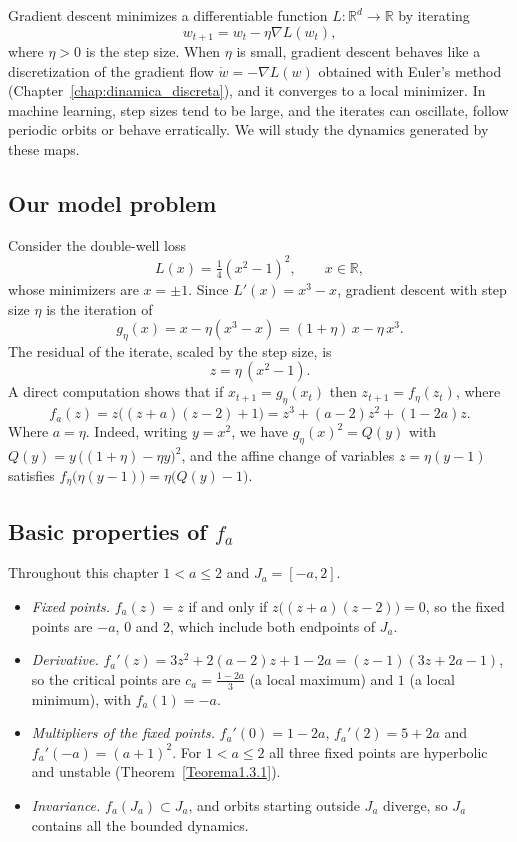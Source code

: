 \documentclass[12pt,a4paper]{report}
\theoremstyle{definition}
\begin{document}
Gradient descent minimizes a differentiable function $L:\mathbb{R}^d\to\mathbb{R}$ by iterating
\[
w_{t+1} = w_t - \eta \nabla L(w_t),
\]
where $\eta>0$ is the step size. When $\eta$ is small, gradient descent behaves like a discretization of the gradient flow $\dot w = -\nabla L(w)$ obtained with Euler's method (Chapter~\ref{chap:dinamica_discreta}), and it converges to a local minimizer. In machine learning, step sizes tend to be large, and the iterates can oscillate, follow periodic orbits or behave erratically. We will study the dynamics generated by these maps.

\subsection*{Our model problem}

Consider the double-well loss
\[
L(x) = \tfrac14 (x^2-1)^2, \qquad x\in\mathbb{R},
\]
whose minimizers are $x=\pm 1$. Since $L'(x) = x^3 - x$, gradient descent with step size $\eta$ is the iteration of
\[
g_\eta(x) = x - \eta (x^3-x) = (1+\eta)\,x - \eta\, x^3 .
\]
The residual of the iterate, scaled by the step size, is
\[
z = \eta\,(x^2-1).
\]
A direct computation shows that if $x_{t+1} = g_\eta(x_t)$ then $z_{t+1} = f_\eta(z_t)$, where
\[
f_a(z) = z\big((z+a)(z-2)+1\big) = z^3 + (a-2)z^2 + (1-2a)z .
\]
Where $a = \eta$.
Indeed, writing $y = x^2$, we have $g_\eta(x)^2 = Q(y)$ with $Q(y) = y\,\big((1+\eta)-\eta y\big)^2$, and the affine change of variables $z = \eta(y-1)$ satisfies $f_\eta\big(\eta(y-1)\big) = \eta\big(Q(y)-1\big)$.

\subsection*{Basic properties of $f_a$}

Throughout this chapter $1 < a \le 2$ and $J_a = [-a,2]$.

\begin{itemize}
    \item \emph{Fixed points.} $f_a(z) = z$ if and only if $z\big((z+a)(z-2)\big) = 0$, so the fixed points are $-a$, $0$ and $2$, which include both endpoints of $J_a$.
    \item \emph{Derivative.} $f_a'(z) = 3z^2 + 2(a-2)z + 1-2a = (z-1)(3z+2a-1)$, so the critical points are $c_a = \frac{1-2a}{3}$ (a local maximum) and $1$ (a local minimum), with $f_a(1) = -a$.
    \item \emph{Multipliers of the fixed points.} $f_a'(0) = 1-2a$, $f_a'(2) = 5+2a$ and $f_a'(-a) = (a+1)^2$. For $1<a\le 2$ all three fixed points are hyperbolic and unstable (Theorem~\ref{Teorema1.3.1}).
    \item \emph{Invariance.} $f_a(J_a)\subset J_a$, and orbits starting outside $J_a$ diverge, so $J_a$ contains all the bounded dynamics.
\end{itemize}
\end{document}
